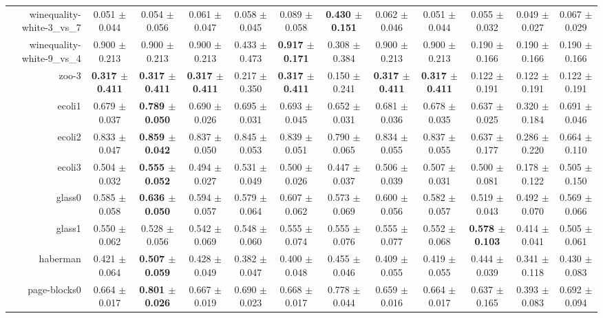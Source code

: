 \begin{table}[!ht]
{\begin{tabular}{r c c c c c c c c c c c}
winequality-white-3\_vs\_7 & 0.051 $\pm$ 0.044 & 0.054 $\pm$ 0.056 & 0.061 $\pm$ 0.047 & 0.058 $\pm$ 0.045 & 0.089 $\pm$ 0.058 & \textbf{0.430 $\pm$ 0.151} & 0.062 $\pm$ 0.046 & 0.051 $\pm$ 0.044 & 0.055 $\pm$ 0.032 & 0.049 $\pm$ 0.027 & 0.067 $\pm$ 0.029 \\
winequality-white-9\_vs\_4 & 0.900 $\pm$ 0.213 & 0.900 $\pm$ 0.213 & 0.900 $\pm$ 0.213 & 0.433 $\pm$ 0.473 & \textbf{0.917 $\pm$ 0.171} & 0.308 $\pm$ 0.384 & 0.900 $\pm$ 0.213 & 0.900 $\pm$ 0.213 & 0.190 $\pm$ 0.166 & 0.190 $\pm$ 0.166 & 0.190 $\pm$ 0.166 \\
zoo-3 & \textbf{0.317 $\pm$ 0.411} & \textbf{0.317 $\pm$ 0.411} & \textbf{0.317 $\pm$ 0.411} & 0.217 $\pm$ 0.350 & \textbf{0.317 $\pm$ 0.411} & 0.150 $\pm$ 0.241 & \textbf{0.317 $\pm$ 0.411} & \textbf{0.317 $\pm$ 0.411} & 0.122 $\pm$ 0.191 & 0.122 $\pm$ 0.191 & 0.122 $\pm$ 0.191 \\
ecoli1 & 0.679 $\pm$ 0.037 & \textbf{0.789 $\pm$ 0.050} & 0.690 $\pm$ 0.026 & 0.695 $\pm$ 0.031 & 0.693 $\pm$ 0.045 & 0.652 $\pm$ 0.031 & 0.681 $\pm$ 0.036 & 0.678 $\pm$ 0.035 & 0.637 $\pm$ 0.025 & 0.320 $\pm$ 0.184 & 0.691 $\pm$ 0.046 \\
ecoli2 & 0.833 $\pm$ 0.047 & \textbf{0.859 $\pm$ 0.042} & 0.837 $\pm$ 0.050 & 0.845 $\pm$ 0.053 & 0.839 $\pm$ 0.051 & 0.790 $\pm$ 0.065 & 0.834 $\pm$ 0.055 & 0.837 $\pm$ 0.055 & 0.637 $\pm$ 0.177 & 0.286 $\pm$ 0.220 & 0.664 $\pm$ 0.110 \\
ecoli3 & 0.504 $\pm$ 0.032 & \textbf{0.555 $\pm$ 0.052} & 0.494 $\pm$ 0.027 & 0.531 $\pm$ 0.049 & 0.500 $\pm$ 0.026 & 0.447 $\pm$ 0.037 & 0.506 $\pm$ 0.039 & 0.507 $\pm$ 0.031 & 0.500 $\pm$ 0.081 & 0.178 $\pm$ 0.122 & 0.505 $\pm$ 0.150 \\
glass0 & 0.585 $\pm$ 0.058 & \textbf{0.636 $\pm$ 0.050} & 0.594 $\pm$ 0.057 & 0.579 $\pm$ 0.064 & 0.607 $\pm$ 0.062 & 0.573 $\pm$ 0.069 & 0.600 $\pm$ 0.056 & 0.582 $\pm$ 0.057 & 0.519 $\pm$ 0.043 & 0.492 $\pm$ 0.070 & 0.569 $\pm$ 0.066 \\
glass1 & 0.550 $\pm$ 0.062 & 0.528 $\pm$ 0.056 & 0.542 $\pm$ 0.069 & 0.548 $\pm$ 0.060 & 0.555 $\pm$ 0.074 & 0.555 $\pm$ 0.076 & 0.555 $\pm$ 0.077 & 0.552 $\pm$ 0.068 & \textbf{0.578 $\pm$ 0.103} & 0.414 $\pm$ 0.041 & 0.505 $\pm$ 0.061 \\
haberman & 0.421 $\pm$ 0.064 & \textbf{0.507 $\pm$ 0.059} & 0.428 $\pm$ 0.049 & 0.382 $\pm$ 0.047 & 0.400 $\pm$ 0.048 & 0.455 $\pm$ 0.046 & 0.409 $\pm$ 0.055 & 0.419 $\pm$ 0.055 & 0.444 $\pm$ 0.039 & 0.341 $\pm$ 0.118 & 0.430 $\pm$ 0.083 \\
page-blocks0 & 0.664 $\pm$ 0.017 & \textbf{0.801 $\pm$ 0.026} & 0.667 $\pm$ 0.019 & 0.690 $\pm$ 0.023 & 0.668 $\pm$ 0.017 & 0.778 $\pm$ 0.044 & 0.659 $\pm$ 0.016 & 0.664 $\pm$ 0.017 & 0.637 $\pm$ 0.165 & 0.393 $\pm$ 0.083 & 0.692 $\pm$ 0.094 \\

\end{tabular}}
\end{table}
